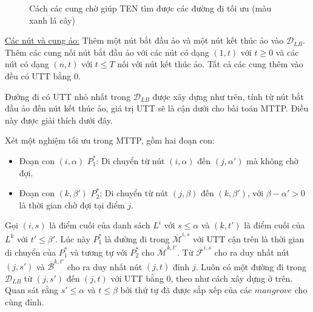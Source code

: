 \documentclass[../main.tex]{subfiles}
\begin{document}
\begin{figure}
\centering
\caption{Cách các cung chờ giúp TEN tìm được các đường đi tối ưu
(màu xanh lá cây)}
\label{fig:10}
\end{figure}

\underline{Các nút và cung ảo:} Thêm một nút bắt đầu ảo và một nút kết thúc ảo vào
\(\mathcal D_{LB}\). Thêm các cung nối nút bắt đầu ảo với các nút có
dạng \((1,t)\) với \(t\geq 0\) và các nút có dạng \((n,t)\) với
\(t\leq T\) nối với nút kết thúc ảo. Tất cả các cung thêm vào đều có UTT
bằng \(0\).

Đường đi có UTT nhỏ nhất trong \(\mathcal D_{LB}\) được xây dựng như
trên, tính từ nút bắt đầu ảo đến nút kết thúc ảo, giá trị UTT sẽ là cận
dưới cho bài toán MTTP. Điều này được giải thích dưới đây.

Xét một nghiệm tối ưu trong MTTP, gồm hai đoạn con:

\begin{itemize}
\tightlist
\item

  Đoạn con \((i,\alpha)\) \(P_1^*\): Di chuyển từ nút \((i, \alpha)\)
  đến \((j, \alpha')\) mà không chờ đợi.
\item
  Đoạn con \((k,\beta')\) \(P_2^*\): Di chuyển từ nút \((j,\beta)\) đến
  \((k,\beta')\), với \(\beta -  \alpha' > 0\) là thời gian chờ đợi tại
  điểm \(j\).
\end{itemize}

Gọi \((i, s)\) là điểm cuối của danh sách \(L^i\) với \(s \leq \alpha\)
và \((k,t')\) là điểm cuối của \(L^k\) với \(t' \leq \beta'\). Lúc này
\(P_1^*\) là đường đi trong \(\overline{\mathcal M}^{i,s}\) với UTT cận trên
là thời gian di chuyển của \(P_1^*\) và tương tự với \(P_2^*\) cho
\(\overline{\mathcal M}^{k,t'}\). Từ \(\mathcal{\overline{F}}^{i,s}\) cho ra duy
nhất nút \((j, s')\) và \(\mathcal{\overline{B}}^{k,t'}\) cho ra duy nhất nút
\((j,t)\) đỉnh \(j\). Luôn có một đường đi trong \(\mathcal D_{LB}\) từ
\((j, s')\) đến \((j,t)\) với UTT bằng \(0\), theo như cách xây dựng ở
trên. Quan sát rằng \(s'\leq \alpha\) và \(t\leq \beta\) bởi thứ tự đã
được sắp xếp của các \(mangrove\) cho cùng đỉnh.
\end{document}
